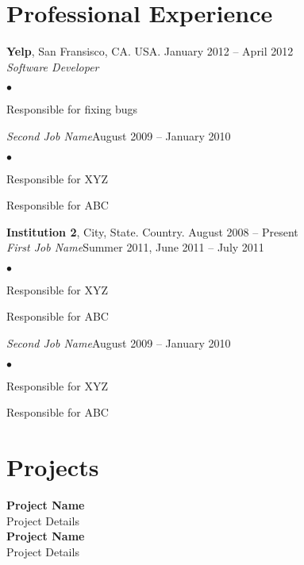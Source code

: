 \documentclass[margin,line]{res}
\newenvironment{list2}{
  \begin{list}{$\bullet$}{%
      \setlength{\itemsep}{0in}
      \setlength{\parsep}{0in} \setlength{\parskip}{0in}
      \setlength{\topsep}{0in} \setlength{\partopsep}{0in}
      \setlength{\leftmargin}{0.2in}}}{\end{list}}
\begin{document}
\begin{resume}
\section{\sc Professional Experience}
{\bf Yelp}, San Fransisco, CA. USA. \hfill{January 2012 -- April 2012}\\
{\em Software Developer}\hfill\\
\begin{list2} %
\item Responsible for fixing bugs \\
\end{list2}
{\em Second Job Name}\hfill {August 2009 -- January 2010}\\
\begin{list2} %
\item Responsible for XYZ \\
\item Responsible for ABC\\
\end{list2}
{\bf Institution 2}, City, State. Country. \hfill{August 2008 -- Present}\\
{\em First Job Name}\hfill {Summer 2011, June 2011 -- July 2011}\\
\begin{list2} %
\item Responsible for XYZ \\
\item Responsible for ABC\\
\end{list2}
{\em Second Job Name}\hfill {August 2009 -- January 2010}\\
\begin{list2} %
\item Responsible for XYZ \\
\item Responsible for ABC\\
\end{list2}
\section{\sc Projects}
{\bf Project Name}\\
Project Details\\

{\bf Project Name}\\
Project Details\\


\end{resume}
\end{document}
